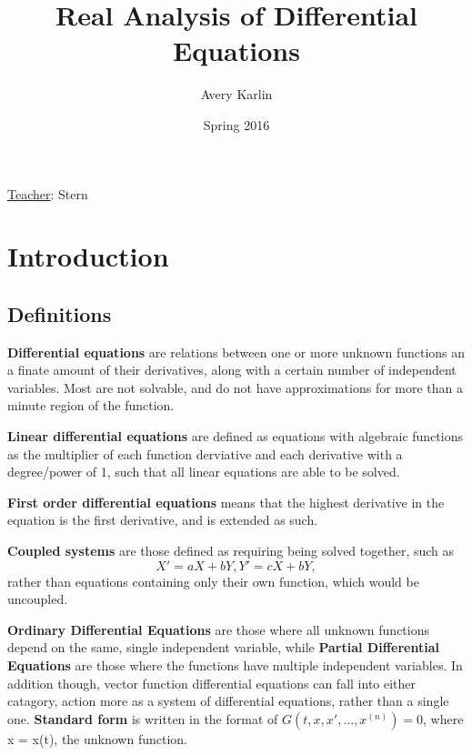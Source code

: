 \documentclass[11 pt, twoside]{article}
\begin{document}
\title{Real Analysis of Differential Equations}
\author{Avery Karlin}
\date{Spring 2016}
\newcommand{\teacher}{Stern}

\maketitle
\newpage
\hypertarget{content}{\tableofcontents}
\vspace{11pt}
\noindent
\underline{Teacher}: \teacher
\newpage

\section{Introduction}

\subsection{Definitions}

\textbf{Differential equations} are relations between one or more unknown functions an a finate amount of their derivatives, along with a certain number of independent variables. Most are not solvable, and do not have approximations for more than a minute region of the function.

\textbf{Linear differential equations} are defined as equations with algebraic functions as the multiplier of each function derviative and each derivative with a degree/power of 1, such that all linear equations are able to be solved.

\textbf{First order differential equations} means that the highest derivative in the equation is the first derivative, and is extended as such.

\textbf{Coupled systems} are those defined as requiring being solved together, such as $$X' = aX + bY, Y' = cX + bY,$$ rather than equations containing only their own function, which would be uncoupled.

\textbf{Ordinary Differential Equations} are those where all unknown functions depend on the same, single independent variable, while \textbf{Partial Differential Equations} are those where the functions have multiple independent variables. In addition though, vector function differential equations can fall into either catagory, action more as a system of differential equations, rather than a single one. \textbf{Standard form} is written in the format of $G(t, x, x', \dots, x^{(n)}) = 0$, where x = x(t), the unknown function.
\end{document}
